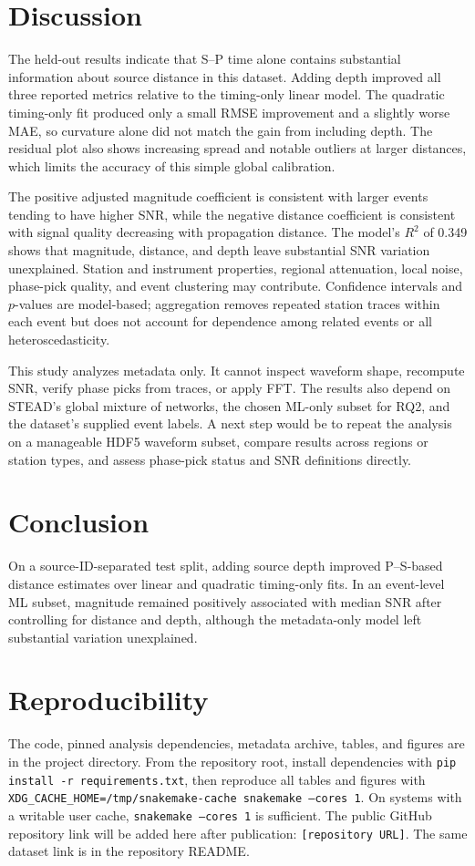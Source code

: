 \documentclass[sigconf,nonacm]{acmart}
\begin{document}
\section{Discussion}
The held-out results indicate that S--P time alone contains substantial information about source distance in this dataset. Adding depth improved all three reported metrics relative to the timing-only linear model. The quadratic timing-only fit produced only a small RMSE improvement and a slightly worse MAE, so curvature alone did not match the gain from including depth. The residual plot also shows increasing spread and notable outliers at larger distances, which limits the accuracy of this simple global calibration.

The positive adjusted magnitude coefficient is consistent with larger events tending to have higher SNR, while the negative distance coefficient is consistent with signal quality decreasing with propagation distance. The model's $R^2$ of 0.349 shows that magnitude, distance, and depth leave substantial SNR variation unexplained. Station and instrument properties, regional attenuation, local noise, phase-pick quality, and event clustering may contribute. Confidence intervals and $p$-values are model-based; aggregation removes repeated station traces within each event but does not account for dependence among related events or all heteroscedasticity.

This study analyzes metadata only. It cannot inspect waveform shape, recompute SNR, verify phase picks from traces, or apply FFT. The results also depend on STEAD's global mixture of networks, the chosen ML-only subset for RQ2, and the dataset's supplied event labels. A next step would be to repeat the analysis on a manageable HDF5 waveform subset, compare results across regions or station types, and assess phase-pick status and SNR definitions directly.

\section{Conclusion}
On a source-ID-separated test split, adding source depth improved P--S-based distance estimates over linear and quadratic timing-only fits. In an event-level ML subset, magnitude remained positively associated with median SNR after controlling for distance and depth, although the metadata-only model left substantial variation unexplained.

\section{Reproducibility}
The code, pinned analysis dependencies, metadata archive, tables, and figures are in the project directory. From the repository root, install dependencies with \texttt{pip install -r requirements.txt}, then reproduce all tables and figures with \texttt{XDG\_CACHE\_HOME=/tmp/snakemake-cache snakemake --cores 1}. On systems with a writable user cache, \texttt{snakemake --cores 1} is sufficient. The public GitHub repository link will be added here after publication: \texttt{[repository URL]}. The same dataset link is in the repository README.
\end{document}
